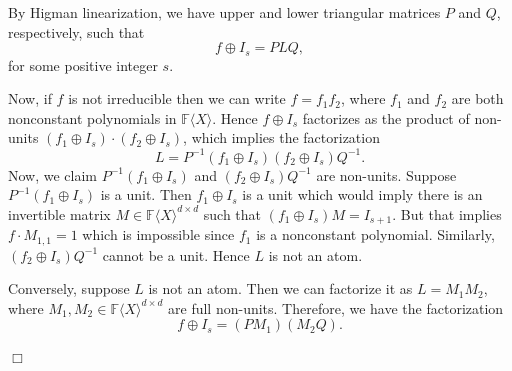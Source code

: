 \documentclass[10pt,a4paper]{article}
\newenvironment{proofof}[1]{\noindent{\it Proof of #1. }} {{\qed}}
\def\qed{\hspace*{\fill} $\Box$\par\medskip}
\newcommand{\F}{\mathbb{F}}
\renewcommand{\angle}[1]{\langle #1 \rangle}
\newcommand{\FX}{\F\angle{X}}
\newcommand{\fR}{\FX}
\begin{document}
\begin{proofof}{Theorem~\ref{associates-preseve-atoms}}
By Higman linearization, we have upper and lower triangular matrices
$P$ and $Q$, respectively, such that
\[
f\oplus I_s = PLQ,
\]
for some positive integer $s$.

Now, if $f$ is not irreducible then we can write $f=f_1f_2$, where
$f_1$ and $f_2$ are both nonconstant polynomials in $\fR$. Hence
$f\oplus I_s$ factorizes as the product of non-units $(f_1\oplus
I_s)\cdot (f_2\oplus I_s)$, which implies the factorization
\[
L = P^{-1}(f_1\oplus I_s)(f_2\oplus I_s)Q^{-1}.
\]
Now, we claim $P^{-1}(f_1\oplus I_s)$ and $(f_2\oplus I_s)Q^{-1}$ are
non-units. Suppose $P^{-1}(f_1\oplus I_s)$ is a unit. Then $f_1\oplus
I_s$ is a unit which would imply there is an invertible matrix
$M\in\fR^{d\times d}$ such that $(f_1\oplus I_s)M=I_{s+1}$. But that
implies $f\cdot M_{1,1}=1$ which is impossible since $f_1$ is a
nonconstant polynomial. Similarly, $(f_2\oplus I_s)Q^{-1}$ cannot be a
unit. Hence $L$ is not an atom.

Conversely, suppose $L$ is not an atom. Then we can factorize it as
$L=M_1M_2$, where $M_1,M_2\in \fR^{d\times d}$ are
full non-units. Therefore, we have the factorization
\[
f\oplus I_s = (PM_1)(M_2Q).
\]


\end{proofof}
\end{document}
